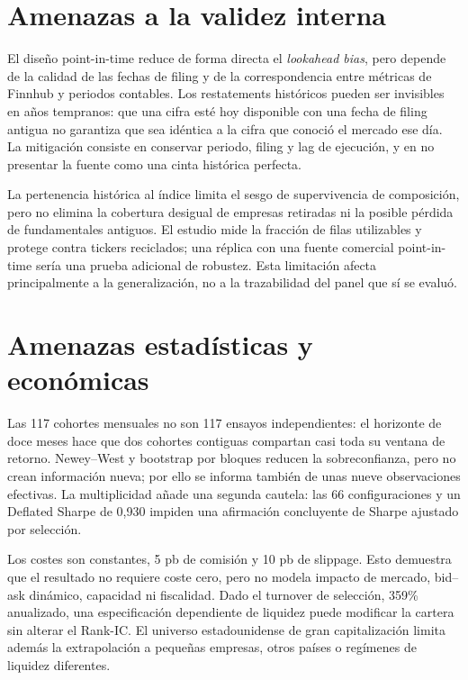 \section{Amenazas a la validez interna}

El diseño point-in-time reduce de forma directa el \textit{lookahead bias}, pero depende de la
calidad de las fechas de filing y de la correspondencia entre métricas de Finnhub y periodos
contables. Los restatements históricos pueden ser invisibles en años tempranos: que una cifra esté
hoy disponible con una fecha de filing antigua no garantiza que sea idéntica a la cifra que conoció
el mercado ese día. La mitigación consiste en conservar periodo, filing y lag de ejecución, y en no
presentar la fuente como una cinta histórica perfecta.

La pertenencia histórica al índice limita el sesgo de supervivencia de composición, pero no elimina
la cobertura desigual de empresas retiradas ni la posible pérdida de fundamentales antiguos. El
estudio mide la fracción de filas utilizables y protege contra tickers reciclados; una réplica con
una fuente comercial point-in-time sería una prueba adicional de robustez. Esta limitación afecta
principalmente a la generalización, no a la trazabilidad del panel que sí se evaluó.

\section{Amenazas estadísticas y económicas}

Las 117 cohortes mensuales no son 117 ensayos independientes: el horizonte de doce meses hace que
dos cohortes contiguas compartan casi toda su ventana de retorno. Newey--West y bootstrap por bloques
reducen la sobreconfianza, pero no crean información nueva; por ello se informa también de unas
nueve observaciones efectivas. La multiplicidad añade una segunda cautela: las 66 configuraciones y
un Deflated Sharpe de 0,930 impiden una afirmación concluyente de Sharpe ajustado por selección.

Los costes son constantes, 5 pb de comisión y 10 pb de slippage. Esto demuestra que el resultado no
requiere coste cero, pero no modela impacto de mercado, bid--ask dinámico, capacidad ni fiscalidad.
Dado el turnover de selección, 359\% anualizado, una especificación dependiente de liquidez puede
modificar la cartera sin alterar el Rank-IC. El universo estadounidense de gran capitalización limita
además la extrapolación a pequeñas empresas, otros países o regímenes de liquidez diferentes.

